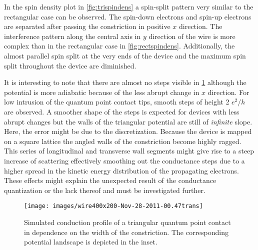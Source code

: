 In the spin density plot in \cref{fig:trispindens} a spin-split pattern very similar to the rectangular case can be observed. The spin-down electrons and spin-up electrons are separated after passing the constriction in positive $x$ direction. The interference pattern along the central axis in $y$ direction of the wire is more complex than in the rectangular case in \cref{fig:rectspindens}. Additionally, the almost parallel spin split at the very ends of the device and the maximum spin split throughout the device are diminished.\par
It is interesting to note that there are almost no steps visible in \cref{fig:tritrans} although the potential is more adiabatic because of the less abrupt change in $x$ direction. For low intrusion of the quantum point contact tips, smooth steps of height 2 $e^2/h$ are observed. A smoother shape of the steps is expected for devices with less abrupt changes but the walls of the triangular potential are still of \emph{infinite} slope. Here, the error might be due to the  discretization. Because the device is mapped on a square lattice the angled walls of the constriction become highly ragged. This series of longitudinal and transverse wall segments might give rise to a steep increase of scattering effectively smoothing out the conductance steps due to a higher spread in the kinetic energy distribution of the propagating electrons. These effects might explain the unexpected result of the conductance quantization or the lack thereof and must be investigated further.\par
\begin{figure}[h]
  \centering
  \texttt{[image: images/wire400x200-Nov-28-2011-00.47trans]}
  \caption{Simulated conduction profile of a triangular quantum point contact in dependence on the width of the constriction. The corresponding potential landscape is depicted in the inset.}\label{fig:tritrans}
\end{figure}
\FloatBarrier

